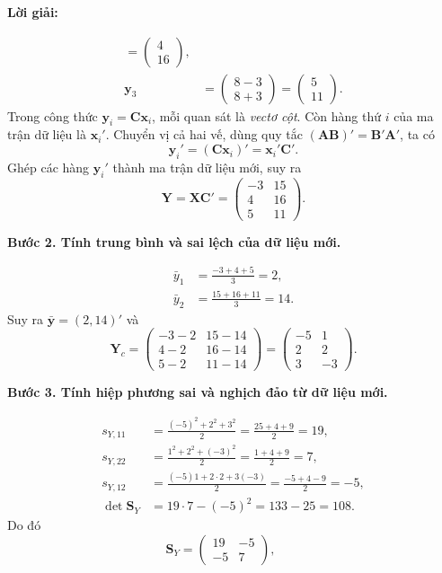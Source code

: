 \documentclass[11pt,a4paper]{article}
\newenvironment{solution}{%
  \par\medskip\noindent\textbf{Lời giải:}\par\nobreak\smallskip\noindent\ignorespaces
}{\par}
\newcommand{\answer}[1]{\boxed{#1}}
\newcommand{\step}[2]{\par\medskip\noindent\textbf{Bước #1. #2}\par\nopagebreak[4]\smallskip\noindent}
\begin{document}
\begin{solution}
\begin{enumerate}[label=\textbf{\alph*)}]
\begin{align*}
=\begin{pmatrix}4\\16\end{pmatrix},\\
\mathbf{y}_3&=\begin{pmatrix}8-3\\8+3\end{pmatrix}
=\begin{pmatrix}5\\11\end{pmatrix}.
\end{align*}
Trong công thức $\mathbf{y}_i=\mathbf{C}\mathbf{x}_i$, mỗi quan sát là
\emph{vectơ cột}. Còn hàng thứ $i$ của ma trận dữ liệu là $\mathbf{x}_i'$.
Chuyển vị cả hai vế, dùng quy tắc $(\mathbf{A}\mathbf{B})'
=\mathbf{B}'\mathbf{A}'$, ta có
\[
\mathbf{y}_i'=(\mathbf{C}\mathbf{x}_i)'=\mathbf{x}_i'\mathbf{C}'.
\]
Ghép các hàng $\mathbf{y}_i'$ thành ma trận dữ liệu mới, suy ra
\[
\answer{\mathbf{Y}=\mathbf{X}\mathbf{C}'
=\begin{pmatrix}-3&15\\4&16\\5&11\end{pmatrix}}.
\]
\step{2}{Tính trung bình và sai lệch của dữ liệu mới.}
\begin{align*}
\bar{y}_1&=\frac{-3+4+5}{3}=2,\\
\bar{y}_2&=\frac{15+16+11}{3}=14.
\end{align*}
Suy ra $\bar{\mathbf{y}}=(2,14)'$ và
\[
\mathbf{Y}_c=\begin{pmatrix}-3-2&15-14\\4-2&16-14\\5-2&11-14\end{pmatrix}
=\begin{pmatrix}-5&1\\2&2\\3&-3\end{pmatrix}.
\]
\step{3}{Tính hiệp phương sai và nghịch đảo từ dữ liệu mới.}
\begin{align*}
s_{Y,11}&=\frac{(-5)^2+2^2+3^2}{2}=\frac{25+4+9}{2}=19,\\
s_{Y,22}&=\frac{1^2+2^2+(-3)^2}{2}=\frac{1+4+9}{2}=7,\\
s_{Y,12}&=\frac{(-5)1+2\cdot2+3(-3)}{2}=\frac{-5+4-9}{2}=-5,\\
\det\mathbf{S}_Y&=19\cdot7-(-5)^2=133-25=108.
\end{align*}
Do đó
\[
\mathbf{S}_Y=\begin{pmatrix}19&-5\\-5&7\end{pmatrix},\qquad
\]
\end{enumerate}
\end{solution}
\end{document}
